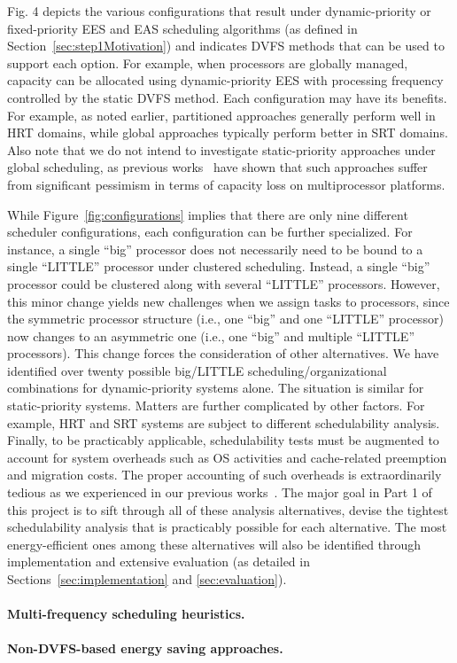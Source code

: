 Fig. 4 depicts the various configurations that result under dynamic-priority or fixed-priority EES and EAS scheduling algorithms (as defined in Section~\ref{sec:step1Motivation}) and indicates DVFS methods that can be used to support each option. For example, when processors are globally managed, capacity can be allocated using dynamic-priority EES with processing frequency controlled by the static DVFS method.  
 Each configuration may have its benefits. For example, as noted earlier, partitioned approaches generally perform well in HRT domains, while global approaches typically perform better in SRT domains. Also note that we do not intend to investigate static-priority approaches under global scheduling, as previous works~\cite{?} have shown that such approaches suffer from significant pessimism in terms of capacity loss on multiprocessor platforms.

While  Figure~\ref{fig:configurations} implies that there are only nine different scheduler configurations, each configuration can be further specialized. For instance, a single ``big'' processor does not necessarily need to be bound to a single ``LITTLE'' processor under clustered scheduling. Instead, a single ``big'' processor could be clustered along with several ``LITTLE'' processors. However, this minor change yields new challenges when we assign tasks to processors, since the symmetric processor structure (i.e., one ``big'' and one ``LITTLE'' processor) now changes to an asymmetric one (i.e., one ``big'' and multiple ``LITTLE'' processors). This change forces the consideration of other alternatives. We have identified over twenty possible big/LITTLE scheduling/organizational combinations for dynamic-priority systems alone. The situation is similar for static-priority systems. Matters are further complicated by other factors. For example, HRT and SRT systems are subject to different schedulability analysis. Finally, to be practicably applicable, schedulability tests must be augmented to account for system overheads such as OS activities and cache-related preemption and migration costs. %
 The proper accounting of such overheads is extraordinarily tedious as we experienced in our previous works~\cite{?}. The major goal in Part 1 of this project is to sift through all of these analysis alternatives, devise the tightest schedulability analysis that is practicably possible for each alternative. The most energy-efficient ones among these alternatives will also be identified through implementation and extensive evaluation (as detailed in Sections~\ref{sec:implementation} and \ref{sec:evaluation}). 




\paragraph{Multi-frequency scheduling heuristics.}


\paragraph{Non-DVFS-based energy saving approaches.}

